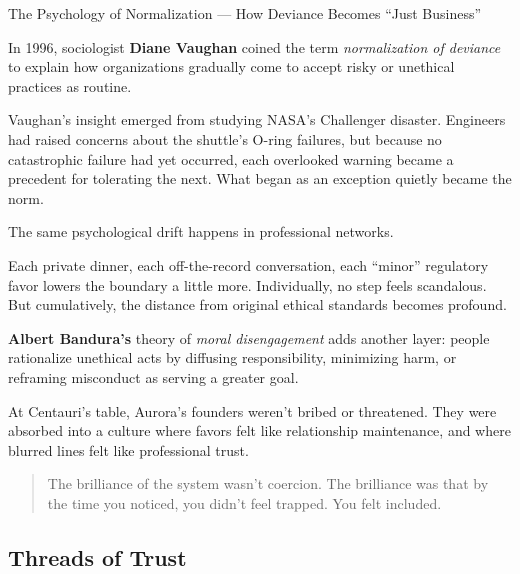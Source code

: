\begin{PsychologicalSidebar}{The Psychology of Normalization --- How Deviance Becomes ``Just Business''}

  In 1996, sociologist \textbf{Diane Vaughan} coined the term \emph{normalization of deviance} to explain how 
  organizations gradually come to accept risky or unethical practices as routine.

  \medskip
  
  Vaughan’s insight emerged from studying NASA’s Challenger disaster. Engineers had raised concerns about the 
  shuttle’s O-ring failures, but because no catastrophic failure had yet occurred, each overlooked warning became 
  a precedent for tolerating the next. What began as an exception quietly became the norm.

  \medskip
  
  The same psychological drift happens in professional networks.

  \medskip
  
  Each private dinner, each off-the-record conversation, each “minor” regulatory favor lowers the boundary a little more. 
  Individually, no step feels scandalous. But cumulatively, the distance from original ethical standards becomes profound.

  \medskip
  
  \textbf{Albert Bandura’s} theory of \emph{moral disengagement} adds another layer: people rationalize unethical acts by 
  diffusing responsibility, minimizing harm, or reframing misconduct as serving a greater goal.

  \medskip
  
  At Centauri’s table, Aurora’s founders weren’t bribed or threatened. They were absorbed into 
  a culture where favors felt like relationship maintenance, and where blurred lines felt like professional trust.
  
  \begin{quote}
  The brilliance of the system wasn’t coercion.  The brilliance was that by the time you noticed, you didn’t feel trapped.  
  You felt included.
  \end{quote}
  
\end{PsychologicalSidebar}

\medskip

\subsection{Threads of Trust}

